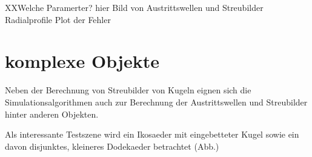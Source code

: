 XXWelche Paramerter?
hier Bild von Austrittswellen und Streubilder
Radialprofile
Plot der Fehler



\section{komplexe Objekte}
Neben der Berechnung von Streubilder von Kugeln eignen sich die Simulationsalgorithmen auch zur Berechnung der Austrittswellen und Streubilder hinter anderen Objekten.

Als interessante Testszene wird ein Ikosaeder mit eingebetteter Kugel sowie ein davon disjunktes, kleineres Dodekaeder betrachtet (Abb.)


